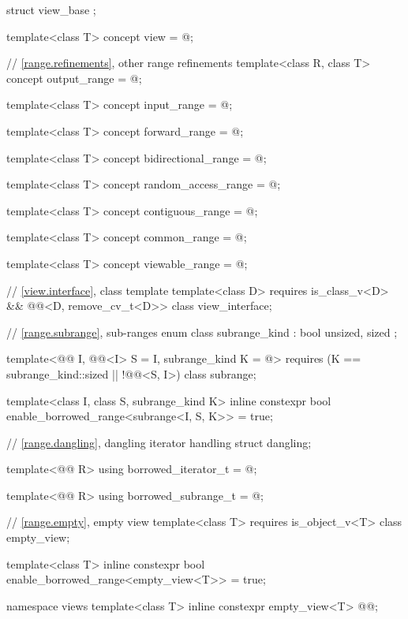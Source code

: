 \begin{codeblock}
{  struct view_base { };

  template<class T>
    concept view = @\seebelow@;

  // \ref{range.refinements}, other range refinements
  template<class R, class T>
    concept output_range = @\seebelow@;

  template<class T>
    concept input_range = @\seebelow@;

  template<class T>
    concept forward_range = @\seebelow@;

  template<class T>
    concept bidirectional_range = @\seebelow@;

  template<class T>
    concept random_access_range = @\seebelow@;

  template<class T>
    concept contiguous_range = @\seebelow@;

  template<class T>
    concept common_range = @\seebelow@;

  template<class T>
    concept viewable_range = @\seebelow@;

  // \ref{view.interface}, class template 
  template<class D>
    requires is_class_v<D> && @@<D, remove_cv_t<D>>
  class view_interface;

  // \ref{range.subrange}, sub-ranges
  enum class subrange_kind : bool { unsized, sized };

  template<@@ I, @@<I> S = I, subrange_kind K = @\seebelow@>
    requires (K == subrange_kind::sized || !@@<S, I>)
  class subrange;

  template<class I, class S, subrange_kind K>
    inline constexpr bool enable_borrowed_range<subrange<I, S, K>> = true;

  // \ref{range.dangling}, dangling iterator handling
  struct dangling;

  template<@@ R>
    using borrowed_iterator_t = @\seebelow@;

  template<@@ R>
    using borrowed_subrange_t = @\seebelow@;

  // \ref{range.empty}, empty view
  template<class T>
    requires is_object_v<T>
  class empty_view;

  template<class T>
    inline constexpr bool enable_borrowed_range<empty_view<T>> = true;

  namespace views {
    template<class T>
      inline constexpr empty_view<T> @@{};
  }

}
\end{codeblock}
